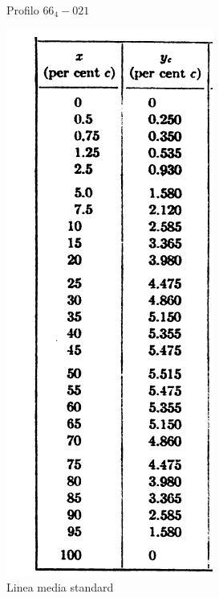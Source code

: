 \begin{figure}[H]
\begin {minipage} [c] {.40\textwidth}
\caption{Profilo $66_4-021$} %
\end{minipage}
\hspace{13mm}%
\begin {minipage} [c] {.40\textwidth}
\centering\setlength{\captionmargin}{0pt}%
\includegraphics[width=.63\textwidth]{immagini/lineamedia.png}      %
\caption{Linea media standard} %
\end{minipage}
\end{figure}

\newpage 

